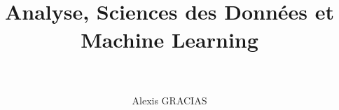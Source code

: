 \documentclass[12pt,french]{report}
\title{
    \HRule \\[0.4cm] \Huge \bfseries 
    Analyse, Sciences des Données et Machine Learning 
    \\[0.15cm] \HRule \\[0.4cm]}
\author{\Large Alexis GRACIAS}
\begin{document}
\maketitle

\dominitoc %
\large \tableofcontents
\normalsize %

\renewcommand{\chaptermark}[1]{ \markboth{#1}{} }
\pagestyle{fancy}
\fancyhead{} %
\fancyhead[RO,LE]{\leftmark}
\fancyfoot{} %

\makeatletter
\renewcommand{\@evenfoot}{\makebox[\textwidth][c]{page {\thepage} sur \pageref{LastPage}}}
\renewcommand{\@oddfoot}{\@evenfoot}
\makeatother

\renewcommand{\labelitemi}{$\bullet$}
\renewcommand{\labelitemii}{---}
\renewcommand{\labelitemiii}{-}
\renewcommand{\labelitemiv}{.}





\end{document}
